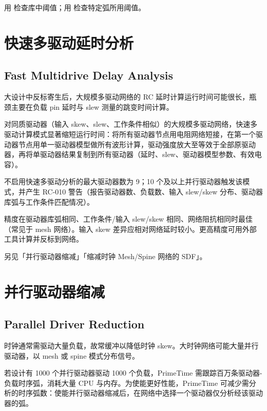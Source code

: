 
用  检查库中阈值；用  检查特定弧所用阈值。

\section{快速多驱动延时分析}
\subsection*{Fast Multidrive Delay Analysis}

大设计中反标寄生后，大规模多驱动网络的 RC 延时计算运行时间可能很长，瓶颈主要在负载 pin 延时与 slew 测量的跳变时间计算。

对同质驱动器（输入 skew、slew、工作条件相似）的大规模多驱动网络，快速多驱动计算模式显著缩短运行时间：将所有驱动器节点用电阻网络短接，在第一个驱动器节点用单一驱动器模型做所有波形计算，驱动强度放大至等效于全部原驱动器，再将单驱动器结果复制到所有驱动器（延时、slew、驱动器模型参数、有效电容）。

不启用快速多驱动分析的最大驱动器数为 9；10 个及以上并行驱动器触发该模式，并产生 RC-010 警告（报告驱动器数、负载数、输入 slew/skew 分布、驱动器库弧与工作条件匹配情况）。

精度在驱动器库弧相同、工作条件/输入 slew/skew 相同、网络阻抗相同时最佳（常见于 mesh 网络）。输入 skew 差异应相对网络延时较小。更高精度可用外部工具计算并反标到网络。

另见「并行驱动器缩减」「缩减时钟 Mesh/Spine 网络的 SDF」。

\section{并行驱动器缩减}
\subsection*{Parallel Driver Reduction}

时钟通常需驱动大量负载，故常缓冲以降低时钟 skew。大时钟网络可能大量并行驱动器，以 mesh 或 spine 模式分布信号。

若设计有 1000 个并行驱动器驱动 1000 个负载，PrimeTime 需跟踪百万条驱动器-负载时序弧，消耗大量 CPU 与内存。为使能更好性能，PrimeTime 可减少需分析的时序弧数：使能并行驱动器缩减后，在网络中选择一个驱动器仅分析经该驱动器的弧。

